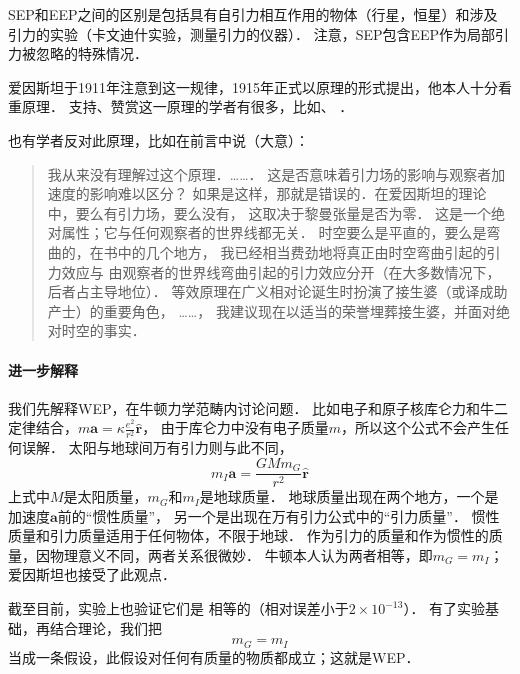 SEP和EEP之间的区别是包括具有自引力相互作用的物体（行星，恒星）和涉及
引力的实验（卡文迪什实验，测量引力的仪器）．
注意，SEP包含EEP作为局部引力被忽略的特殊情况．

爱因斯坦于1911年注意到这一规律，1915年正式以原理的形式提出，他本人十分看重原理．
支持、赞赏这一原理的学者有很多，比如\parencite[Ch.16]{mtw1973}、
\parencite[Ch.2]{will_tegp-2018}．

也有学者反对此原理，比如\textcite{synge-1960}在前言中说（大意）：
\begin{quotation}
    {\fangsong
        我从来没有理解过这个原理．……．
        这是否意味着引力场的影响与观察者加速度的影响难以区分？
        如果是这样，那就是错误的．在爱因斯坦的理论中，要么有引力场，要么没有，
        这取决于黎曼张量是否为零．
        这是一个绝对属性；它与任何观察者的世界线都无关．
        时空要么是平直的，要么是弯曲的，在书中的几个地方，
        我已经相当费劲地将真正由时空弯曲引起的引力效应与
        由观察者的世界线弯曲引起的引力效应分开（在大多数情况下，后者占主导地位）．
        等效原理在广义相对论诞生时扮演了接生婆（或译成助产士）的重要角色，
        ……，
        我建议现在以适当的荣誉埋葬接生婆，并面对绝对时空的事实．
    }
\end{quotation}

\paragraph{进一步解释}
我们先解释WEP，在牛顿力学范畴内讨论问题．
比如电子和原子核库仑力和牛二定律结合，$m \boldsymbol{a}= \kappa \frac{e^2}{r^2} \hat{\boldsymbol{r}}$，
由于库仑力中没有电子质量$m$，所以这个公式不会产生任何误解．
太阳与地球间万有引力则与此不同，
\begin{equation}\label{chfd:eqn_gmig}
    m_I \boldsymbol{a} = \frac{GM m_G}{r^2 } \hat{\boldsymbol{r}}
\end{equation}
上式中$M$是太阳质量，$m_G$和$m_I$是地球质量．
地球质量出现在两个地方，一个是加速度$\boldsymbol{a}$前的“惯性质量”，
另一个是出现在万有引力公式中的“引力质量”．
惯性质量和引力质量适用于任何物体，不限于地球．
作为引力的质量和作为惯性的质量，因物理意义不同，两者关系很微妙．
牛顿本人认为两者相等，即$m_G=m_I$；爱因斯坦也接受了此观点．

截至目前，实验\cite[\S 2.3.1]{will_tegp-2018}上也验证它们是
相等的（相对误差小于$2\times 10^{-13}$）．
有了实验基础，再结合理论，我们把
\begin{equation}\label{chfd:eqn_mG=mI}
    m_G=m_I
\end{equation}
当成一条{\heiti 假设}，此假设对任何有质量的物质都成立；这就是WEP．

